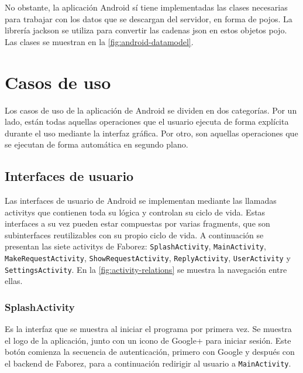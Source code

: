 \documentclass[main]{subfiles}
\begin{document}
No obstante, la aplicación Android sí tiene implementadas las clases necesarias para trabajar con los datos que se descargan del servidor, en forma de \glspl{pojo}. La librería \gls{jackson} se utiliza para convertir las cadenas \gls{json} en estos objetos \gls{pojo}. Las clases se muestran en la \cref{fig:android-datamodel}.



\section{Casos de uso}

Los casos de uso de la aplicación de Android se dividen en dos categorías. Por un lado, están todas aquellas operaciones que el usuario ejecuta de forma explícita durante el uso mediante la interfaz gráfica. Por otro, son aquellas operaciones que se ejecutan de forma automática en segundo plano.

\subsection{Interfaces de usuario}

Las interfaces de usuario de Android se implementan mediante las llamadas \glspl{activity} que contienen toda su lógica y controlan su ciclo de vida. Estas interfaces a su vez pueden estar compuestas por varias \glspl{fragment}, que son subinterfaces reutilizables con su propio ciclo de vida. A continuación se presentan las siete \glspl{activity} de Faborez: \texttt{SplashActivity}, \texttt{MainActivity}, \texttt{MakeRequestActivity}, \texttt{ShowRequestActivity}, \texttt{ReplyActivity}, \texttt{UserActivity} y \texttt{SettingsActivity}. En la \cref{fig:activity-relations} se muestra la navegación entre ellas.



\subsubsection{SplashActivity}

Es la interfaz que se muestra al iniciar el programa por primera vez. Se muestra el logo de la aplicación, junto con un icono de Google+ para iniciar sesión. Este botón comienza la secuencia de autenticación, primero con Google y después con el \gls{backend} de Faborez, para a continuación redirigir al usuario a \texttt{MainActivity}.
\end{document}

